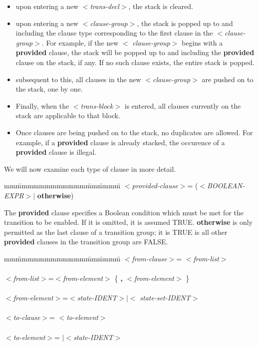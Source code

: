 \begin{itemize}
\item upon entering a new $<${\em trans-decl}$>$, the stack is cleared.
\item upon entering a new $<${\em clause-group}$>$, the stack is popped
up to and including the clause type corresponding to the first clause
in the $<${\em clause-group}$>$. For example, if the new $<${\em
clause-group$>$} begins with a {\bf provided} clause, the stack will be
popped up to and including the {\bf provided} clause on the stack, if
any. If no such clause exists, the entire stack is popped.
\item subsequent to this, all clauses in the new $<${\em clause-group}$>$
are pushed on to the stack, one by one.
\item Finally, when the $<${\em trans-block}$>$ is entered, all clauses
currently on the stack are applicable to that block.
\item Once clauses are being pushed on to the stack, no duplicates
are allowed. For example, if a {\bf provided} clause is already
stacked, the occurence of a {\bf provided} clause is illegal.
\end{itemize}

We will now examine each type of clause in more detail.

\begin{tabbing}
mm\=mmmmmmmmmmmm\=mm\=mmmm\=\+\kill
$<${\em provided-clause}$>$\>= ($<${\em BOOLEAN-EXPR}$>|$ {\bf otherwise})
\end{tabbing}

The {\bf provided} clause specifies a Boolean condition which
must be met for the transition to be enabled. If it is
omitted, it is assumed TRUE. {\bf otherwise} is only permitted as
the last clause of a transition group; it is TRUE is all other
{\bf provided} clauses in the transition group are FALSE.

\begin{tabbing}
mm\=mmmmmmmmmmmm\=mm\=mmmm\=\+\kill
$<${\em from-clause}$>$\>= $<${\em from-list}$>$\\
\mbox{}\\
$<${\em from-list}$>$\>=\>$<${\em from-element}$>$ \{ {\bf ,} $<${\em from-element}$>$
\}\\
\mbox{}\\
$<${\em from-element}$>$\>=\>$<${\em state-IDENT}$>|<${\em
state-set-IDENT}$>$\\
\mbox{}\\
$<${\em to-clause}$>$\>= $<${\em to-element}$>$\\
\mbox{}\\
$<${\em to-element}$>$\>= $|<${\em state-IDENT}$>$
\end{tabbing}


